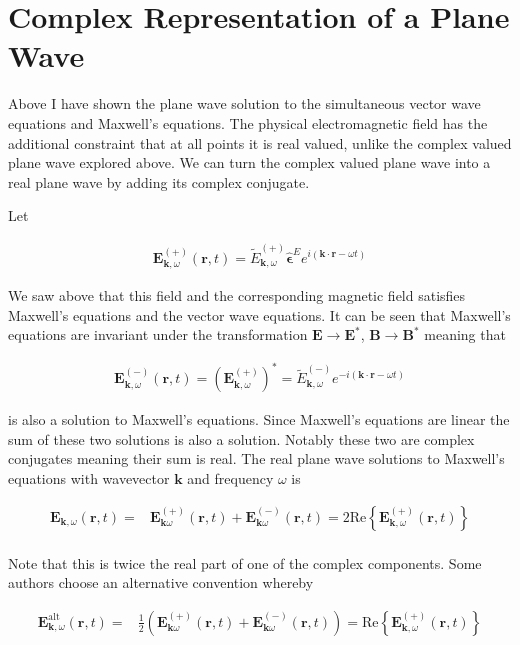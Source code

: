 \documentclass[12pt]{article}
\newcommand{\ep}{\epsilon}
\renewcommand{\vec}[1]{\boldsymbol{#1}}
\newcommand{\unitvec}[1]{\hat{\boldsymbol{#1}}}
\begin{document}
\section{Complex Representation of a Plane Wave}

Above I have shown the plane wave solution to the simultaneous vector wave equations and Maxwell's equations. 
The physical electromagnetic field has the additional constraint that at all points it is real valued, unlike the complex valued plane wave explored above.
We can turn the complex valued plane wave into a real plane wave by adding its complex conjugate.

Let

\begin{align}
\vec{E}_{\vec{k},\omega}^{(+)}(\vec{r}, t) = \tilde{E}_{\vec{k},\omega}^{(+)} \unitvec{\ep}^E e^{i(\vec{k}\cdot \vec{r} - \omega t)}
\end{align}

We saw above that this field and the corresponding magnetic field satisfies Maxwell's equations and the vector wave equations.
It can be seen that Maxwell's equations are invariant under the transformation $\vec{E} \rightarrow \vec{E}^*$, $\vec{B} \rightarrow \vec{B}^*$ meaning that

\begin{align}
\vec{E}_{\vec{k}, \omega}^{(-)}(\vec{r}, t) = \left(\vec{E}_{\vec{k}, \omega}^{(+)}\right)^* = \tilde{E}_{\vec{k},\omega}^{(-)} e^{-i(\vec{k}\cdot \vec{r} - \omega t)}
\end{align}

is also a solution to Maxwell's equations.
Since Maxwell's equations are linear the sum of these two solutions is also a solution.
Notably these two are complex conjugates meaning their sum is real.
The real plane wave solutions to Maxwell's equations with wavevector $\vec{k}$ and frequency $\omega$ is

\begin{align}
\vec{E}_{\vec{k}, \omega}(\vec{r}, t) =& \vec{E}_{\vec{k} \omega}^{(+)}(\vec{r}, t) + \vec{E}_{\vec{k} \omega}^{(-)}(\vec{r}, t) = 2 \text{Re}\left\{\vec{E}^{(+)}_{\vec{k}, \omega}(\vec{r}, t) \right\}\\
\end{align}

Note that this is twice the real part of one of the complex components.
Some authors choose an alternative convention whereby

\begin{align}
\vec{E}_{\vec{k}, \omega}^{\text{alt}}(\vec{r}, t) =& \frac{1}{2}\left(\vec{E}_{\vec{k} \omega}^{(+)}(\vec{r}, t) + \vec{E}_{\vec{k} \omega}^{(-)}(\vec{r}, t)\right) = \text{Re}\left\{\vec{E}^{(+)}_{\vec{k}, \omega}(\vec{r}, t) \right\}\\
\end{align}
\end{document}
